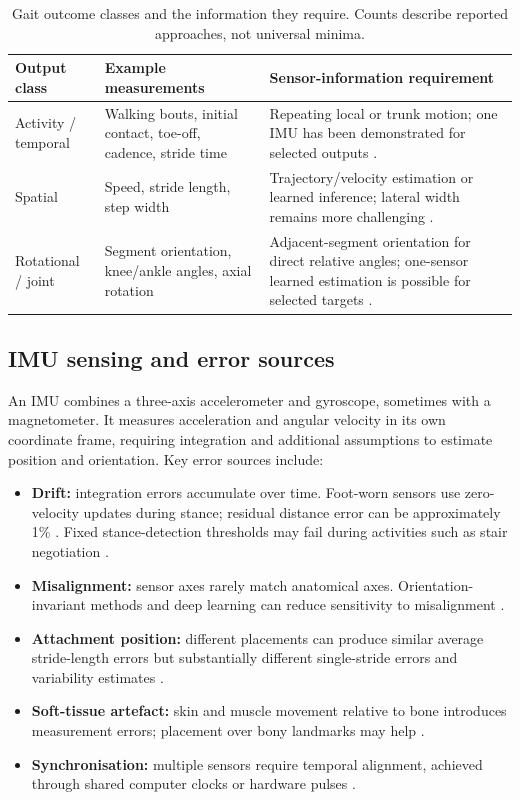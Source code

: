 \documentclass[10pt,a4paper,twocolumn]{article}
\begin{document}
\begin{table}[!t]
 \centering\small
 \caption{Gait outcome classes and the information they require. Counts describe reported approaches, not universal minima.}
 \label{tab:outputs}
 \begin{tabularx}{\linewidth}{@{}p{2.25cm}YY@{}}
 \toprule
 Output class & Example measurements & Sensor-information requirement \\
 \midrule
 Activity / temporal & Walking bouts, initial contact, toe-off, cadence, stride time & Repeating local or trunk motion; one IMU has been demonstrated for selected outputs \citep{prigent2023,romijnders2022}. \\
 Spatial & Speed, stride length, step width & Trajectory/velocity estimation or learned inference; lateral width remains more challenging \citep{zadka2024,wang2025h}. \\
 Rotational / joint & Segment orientation, knee/ankle angles, axial rotation & Adjacent-segment orientation for direct relative angles; one-sensor learned estimation is possible for selected targets \citep{niswander2020,wang2025l}. \\
 \bottomrule
 \end{tabularx}
\end{table}

\subsection{IMU sensing and error sources}

An IMU combines a three-axis accelerometer and gyroscope, sometimes with a magnetometer. It measures acceleration and angular velocity in its own coordinate frame, requiring integration and additional assumptions to estimate position and orientation. Key error sources include:

\begin{itemize}
  \item \textbf{Drift:} integration errors accumulate over time. Foot-worn sensors use zero-velocity updates during stance; residual distance error can be approximately 1\% \citep{ruizruiz2024}. Fixed stance-detection thresholds may fail during activities such as stair negotiation \citep{wagstaff2020}.
  \item \textbf{Misalignment:} sensor axes rarely match anatomical axes. Orientation-invariant methods and deep learning can reduce sensitivity to misalignment \citep{guimaraes2021,romijnders2022}.
  \item \textbf{Attachment position:} different placements can produce similar average stride-length errors but substantially different single-stride errors and variability estimates \citep{kuderle2022}.
  \item \textbf{Soft-tissue artefact:} skin and muscle movement relative to bone introduces measurement errors; placement over bony landmarks may help \citep{scalera2021,nishizawa2026}.
  \item \textbf{Synchronisation:} multiple sensors require temporal alignment, achieved through shared computer clocks or hardware pulses \citep{nishizawa2026,anderson2025}.
\end{itemize}
\end{document}
